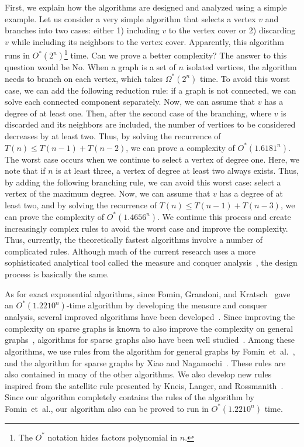 \documentclass[11pt]{article}
\begin{document}
First, we explain how the algorithms are designed and analyzed using a simple example.
Let us consider a very simple algorithm that selects a vertex $v$ and branches into two cases: either 1) including $v$ to the
vertex cover or 2) discarding $v$ while including its neighbors to the vertex cover.
Apparently, this algorithm runs in $O^*(2^n)$\footnote{The $O^*$ notation hides factors polynomial in $n$.} time.
Can we prove a better complexity?
The answer to this question would be No.
When a graph is a set of $n$ isolated vertices, the algorithm needs to branch on each vertex, which takes
$\Omega^*(2^n)$ time.
To avoid this worst case, we can add the following reduction rule: if a graph is not connected, we can solve each
connected component separately.
Now, we can assume that $v$ has a degree of at least one.
Then, after the second case of the branching, where $v$ is discarded and its neighbors are included, the number of
vertices to be considered decreases by at least two.
Thus, by solving the recurrence of $T(n)\leq T(n-1)+T(n-2)$, we can prove a complexity of $O^*(1.6181^n)$.
The worst case occurs when we continue to select a vertex of degree one.
Here, we note that if $n$ is at least three, a vertex of degree at least two always exists.
Thus, by adding the following branching rule, we can avoid this worst case: select a vertex of the maximum degree.
Now, we can assume that $v$ has a degree of at least two, and by solving the recurrence of $T(n)\leq T(n-1)+T(n-3)$, we can
prove the complexity of $O^*(1.4656^n)$.
We continue this process and create increasingly complex rules to avoid the worst case and improve the complexity.
Thus, currently, the theoretically fastest algorithms involve a number of complicated rules.
Although much of the current research uses a more sophisticated analytical tool called the measure and conquer
analysis~\cite{vc_reduction/measure_and_conquer},
the design process is basically the same.

As for exact exponential algorithms,
since Fomin, Grandoni, and Kratsch~\cite{vc_reduction/measure_and_conquer} gave an $O^*(1.2210^n)$-time algorithm by
developing the measure and conquer analysis, several improved algorithms have been
developed~\cite{DBLP:conf/fsttcs/KneisLR09,DBLP:journals/algorithmica/BourgeoisEPR12,DBLP:conf/isaac/XiaoN13}.
Since improving the complexity on sparse graphs is known to also improve the
complexity on general graphs~\cite{DBLP:journals/algorithmica/BourgeoisEPR12}, algorithms for sparse graphs also have
been well studied~\cite{DBLP:journals/jda/Razgon09,DBLP:journals/algorithmica/BourgeoisEPR12,DBLP:conf/isaac/XiaoN13}.
Among these algorithms, we use rules from the algorithm for general graphs by
Fomin~et~al.~\cite{vc_reduction/measure_and_conquer}, and the algorithm for sparse graphs by Xiao and
Nagamochi~\cite{DBLP:conf/isaac/XiaoN13}.
These rules are also contained in many of the other algorithms.
We also develop new rules inspired from the satellite rule presented by
Kneis, Langer, and Rossmanith~\cite{DBLP:conf/fsttcs/KneisLR09}.
Since our algorithm completely contains the rules of the algorithm by Fomin~et~al., our algorithm also can be proved to
run in $O^*(1.2210^n)$ time.
\end{document}

